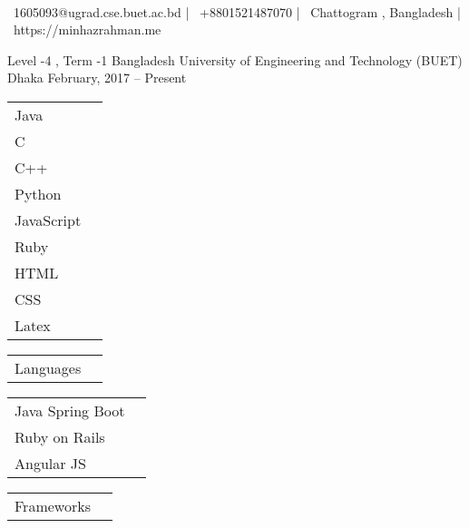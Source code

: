 \documentclass[]{awesome-cv}
\begin{document}
    
\begin{center}
	  \\
	\vspace{2mm}
	{\faEnvelope\ 1605093@ugrad.cse.buet.ac.bd} | {\faMobile\ +8801521487070} | {\faMapMarker\ Chattogram , Bangladesh} | {\faLink\ https://minhazrahman.me}
\end{center}
\begin{cventries}
	\cventry
	{Level -4 , Term -1}
	{Bangladesh University of Engineering and Technology (BUET)}
	{Dhaka}
	{February, 2017 – Present}
	{}
\end{cventries}

\vspace{-2mm}

\begin{cventries}
	\cventry
	{\def\arraystretch{1.15}{\begin{tabular}{ l l }
				Java  & {\skill{ }} \\
				C  & {\skill{ }} \\
				C++  & {\skill{ }} \\
				Python  & {\skill{ }} \\
				JavaScript  & {\skill{ }} \\
				Ruby  & {\skill{ }} \\
				HTML  & {\skill{ }} \\
				CSS  & {\skill{ }} \\
				Latex  & {\skill{ }} \\
	\end{tabular}}}
	{\def\arraystretch{1.15}{\begin{tabular}{ l l }
		Languages  & {\skill{ }} \\
		\end{tabular}}}
	{}
	{}
	{}
	\cventry
	{\def\arraystretch{1.15}{\begin{tabular}{ l l }
				Java Spring Boot  & {\skill{ }} \\
				Ruby on Rails  & {\skill{ }} \\
				Angular JS  & {\skill{ }} \\
	\end{tabular}}}
	{\def\arraystretch{1.15}{\begin{tabular}{ l l }
				Frameworks  & {\skill{ }} \\
	\end{tabular}}}
	{}
	{}
	{}
\end{cventries}
\end{document}
